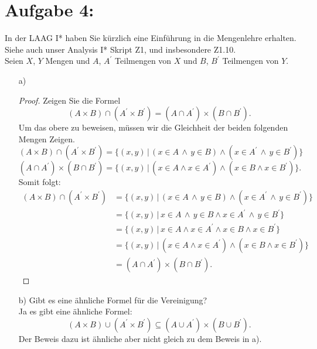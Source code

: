 \documentclass{exam}
\begin{document}
\section*{Aufgabe 4:}
In der LAAG I* haben Sie kürzlich eine Einführung in die Mengenlehre erhalten. Siehe
auch unser Analysis I* Skript Z1, und insbesondere Z1.10. \\
Seien $X$, $Y$ Mengen und $A$, $A^\prime$ Teilmengen von $X$ und $B$, $B^\prime$ Teilmengen von $Y$.
\begin{enumerate}
	\item[a)]
	      \begin{proof}
		      Zeigen Sie die Formel
		      \begin{displaymath}
			      (A \times B) \cap (A^\prime \times B^\prime) = (A \cap A^\prime) \times (B \cap B^\prime).
		      \end{displaymath}
		      Um das obere zu beweisen, müssen wir die Gleichheit der beiden folgenden Mengen Zeigen.
		      \[
			      (A \times B) \cap (A^\prime \times B^\prime) = \{(x,y)\,|\,( x \in A \, \land \, y\in B) \land (x \in A^\prime \, \land \, y \in B^\prime)\}
		      \]
		      \[
			      (A \cap A^\prime) \times (B \cap B^\prime) = \{(x,y)\,|\,(x \in A \land x \in A^\prime) \land (x \in B \land x \in B^\prime)\}.
		      \]
		      Somit folgt:
		      \begin{align}
			      (A \times B) \cap (A^\prime \times B^\prime) & = \{(x,y)\,|\,( x \in A \, \land \, y\in B) \land (x \in A^\prime \, \land \, y \in B^\prime)\} \\
			                                                   & = \{(x,y)\,|\,x \in A \, \land \, y\in B \land x \in A^\prime \, \land \, y \in B^\prime\}      \\
			                                                   & = \{(x,y)\,|\,x \in A \land x \in A^\prime \land x \in B \land x \in B^\prime\}                 \\
			                                                   & = \{(x,y)\,|\,(x \in A \land x \in A^\prime) \land (x \in B \land x \in B^\prime)\}             \\
			                                                   & =  (A \cap A^\prime) \times (B \cap B^\prime).
		      \end{align}
	      \end{proof}
	\item[b)]
	      Gibt es eine ähnliche Formel für die Vereinigung? \\
	      Ja es gibt eine ähnliche Formel: \[
		      (A \times B) \cup (A^\prime \times B^\prime) \subseteq (A \cup A^\prime) \times (B \cup B^\prime).
          \]
          Der Beweis dazu ist ähnliche aber nicht gleich zu dem Beweis in a).
\end{enumerate}
\end{document}
